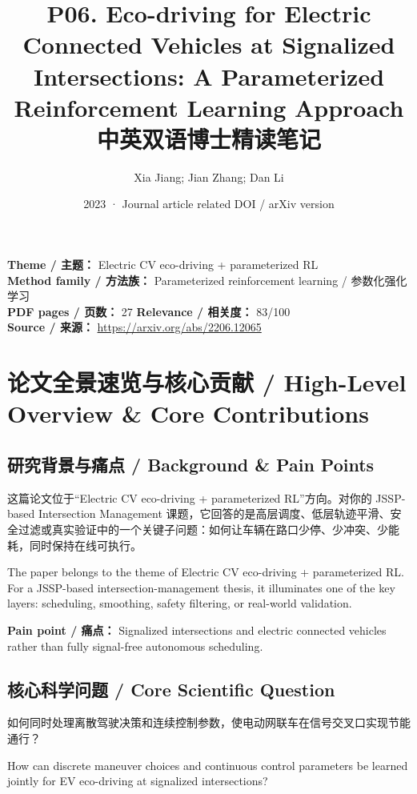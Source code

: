 \documentclass[UTF8,a4paper,11pt,fontset=fandol]{ctexart}
\title{P06. Eco-driving for Electric Connected Vehicles at Signalized Intersections: A Parameterized Reinforcement Learning Approach\\中英双语博士精读笔记}
\author{Xia Jiang; Jian Zhang; Dan Li}
\date{2023 · Journal article related DOI / arXiv version}
\begin{document}
\maketitle

\noindent\textbf{Theme / 主题：} Electric CV eco-driving + parameterized RL\\
\textbf{Method family / 方法族：} Parameterized reinforcement learning / 参数化强化学习\\
\textbf{PDF pages / 页数：} 27 \quad
\textbf{Relevance / 相关度：} 83/100\\
\textbf{Source / 来源：} \url{https://arxiv.org/abs/2206.12065}

\section{论文全景速览与核心贡献 / High-Level Overview \& Core Contributions}
\subsection{研究背景与痛点 / Background \& Pain Points}
这篇论文位于“Electric CV eco-driving + parameterized RL”方向。对你的 JSSP-based Intersection Management 课题，它回答的是高层调度、低层轨迹平滑、安全过滤或真实验证中的一个关键子问题：如何让车辆在路口少停、少冲突、少能耗，同时保持在线可执行。

The paper belongs to the theme of Electric CV eco-driving + parameterized RL. For a JSSP-based intersection-management thesis, it illuminates one of the key layers: scheduling, smoothing, safety filtering, or real-world validation.

\textbf{Pain point / 痛点：} Signalized intersections and electric connected vehicles rather than fully signal-free autonomous scheduling.

\subsection{核心科学问题 / Core Scientific Question}
如何同时处理离散驾驶决策和连续控制参数，使电动网联车在信号交叉口实现节能通行？

How can discrete maneuver choices and continuous control parameters be learned jointly for EV eco-driving at signalized intersections?
\end{document}
